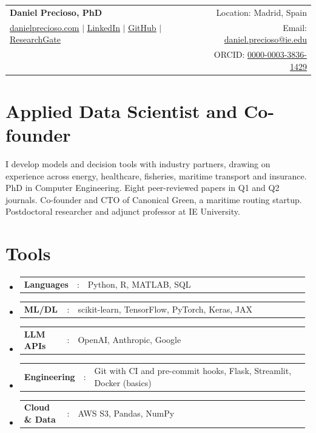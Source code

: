 \documentclass[a4paper,11pt]{article}
\newcommand{\resumeSectionType}[3]{
	\item\begin{tabular*}{0.96\textwidth}[t]{
			p{0.15\linewidth}p{0.02\linewidth}p{0.81\linewidth}
		}
		\textbf{#1} & #2 & #3
	\end{tabular*}\vspace{-2pt}
}
\newcommand{\resumeHeadingListStart}{
	\begin{itemize}[leftmargin=0.15in, label={}]
	}
\newcommand{\resumeHeadingListEnd}{\end{itemize}}
\begin{document}
	
	
	\begin{tabular*}{\textwidth}{l@{\extracolsep{\fill}}r}
		\textbf{\Huge Daniel Precioso, PhD \vspace{2pt}} & %
		Location: Madrid, Spain \\ %
		\href{https://danielprecioso.com}{\uline{danielprecioso.com}} $|$ %
		\href{https://www.linkedin.com/in/daniel-precioso-garcelan}{\uline{LinkedIn}} $|$ %
		\href{https://github.com/daniprec}{\uline{GitHub}} %
		$|$ \href{https://www.researchgate.net/profile/Daniel-Precioso-Garcelan}{\uline{ResearchGate}} %
		& %
		Email: \href{mailto:daniel.precioso@ie.edu}{\uline{daniel.precioso@ie.edu}} \\ %
		& %
		ORCID: \href{https://orcid.org/0000-0003-3836-1429}{\uline{0000-0003-3836-1429}} \\ %
	\end{tabular*}
	
	
	\section{Applied Data Scientist and Co-founder}
	I develop models and decision tools with industry partners, drawing on experience across energy, healthcare, fisheries, maritime transport and insurance. PhD in Computer Engineering. Eight peer-reviewed papers in Q1 and Q2 journals. Co-founder and CTO of Canonical Green, a maritime routing startup. Postdoctoral researcher and adjunct professor at IE University.

	\section{Tools}
	\resumeHeadingListStart{}
	\resumeSectionType{Languages}{:}{Python, R, MATLAB, SQL}
	\resumeSectionType{ML/DL}{:}{scikit-learn, TensorFlow, PyTorch, Keras, JAX}
	\resumeSectionType{LLM APIs}{:}{OpenAI, Anthropic, Google}
	\resumeSectionType{Engineering}{:}{Git with CI and pre-commit hooks, Flask, Streamlit, Docker (basics)}
	\resumeSectionType{Cloud \& Data}{:}{AWS S3, Pandas, NumPy}
	\resumeHeadingListEnd{}
\end{document}
